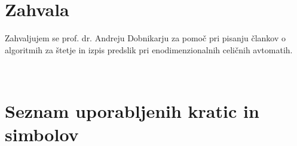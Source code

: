 \documentclass[12pt,a4paper,openany,twoside]{book}
\begin{document}

\chapter*{Zahvala}
\thispagestyle{empty}
Zahvaljujem se prof. dr. Andreju Dobnikarju za pomoč pri pisanju člankov
o algoritmih za štetje in izpis predslik pri enodimenzionalnih celičnih avtomatih.
\newpage

\ \thispagestyle{empty}
\newpage


\renewcommand\thepage{} 
\tableofcontents 
\renewcommand\thepage{\arabic{page}}

\thispagestyle{empty}


\chapter*{Seznam uporabljenih kratic in simbolov}

\thispagestyle{empty}

\end{document}
